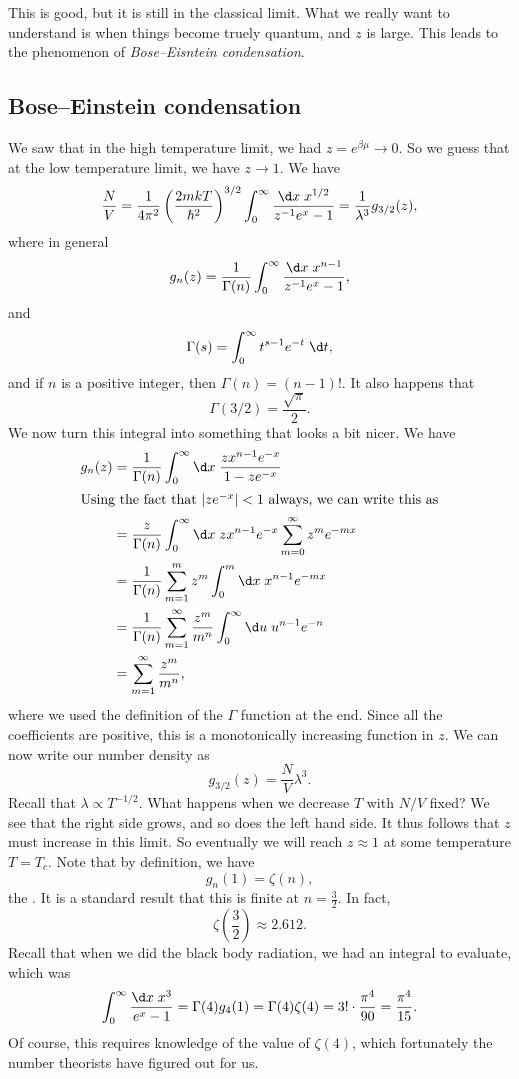 \documentclass[a4paper]{article}
\begin{document}
This is good, but it is still in the classical limit. What we really want to understand is when things become truely quantum, and $z$ is large. This leads to the phenomenon of \emph{Bose--Eisntein condensation}.

\subsection{Bose--Einstein condensation}
We saw that in the high temperature limit, we had $z = e^{\beta\mu} \to 0$. So we guess that at the low temperature limit, we have $z \to 1$. We have
\[
  \frac{N}{V} = \frac{1}{4 \pi^2} \left(\frac{2mkT}{\hbar^2}\right)^{3/2} \int_0^\infty \frac{\d x\; x^{1/2}}{ z^{-1} e^x - 1} = \frac{1}{\lambda^3} g_{3/2}(z),
\]
where in general
\[
  g_n(z) = \frac{1}{\Gamma(n)} \int_0^\infty \frac{\d x\; x^{n - 1}}{z^{-1} e^x - 1},
\]
and
\[
  \Gamma(s) = \int_0^\infty t^{s - 1} e^{-t} \;\d t,
\]
and if $n$ is a positive integer, then $\Gamma(n) = (n - 1)!$. It also happens that
\[
  \Gamma(3/2) = \frac{\sqrt{\pi}}{2}.
\]
We now turn this integral into something that looks a bit nicer. We have
\begin{align*}
  g_n(z) &= \frac{1}{\Gamma(n)} \int_0^\infty \d x\; \frac{z x^{n - 1} e^{-x}}{1 - z e^{-x}}\\
  \intertext{Using the fact that $|z e^{-x}| < 1$ always, we can write this as}
  &= \frac{z}{\Gamma(n)} \int_0^\infty \d x\; z x^{n - 1} e^{-x} \sum_{m = 0}^\infty z^m e^{-mx}\\
  &= \frac{1}{\Gamma(n)} \sum_{m = 1}^m z^m \int_0^m \d x\; x^{n - 1} e^{-mx}\\
  &= \frac{1}{\Gamma(n)} \sum_{m = 1}^\infty \frac{z^m}{m^n}\int_0^\infty \d u\; u^{n - 1} e^{-n}\\
  &= \sum_{m = 1}^\infty \frac{z^m}{m^n},
\end{align*}
where we used the definition of the $\Gamma$ function at the end. Since all the coefficients are positive, this is a monotonically increasing function in $z$. We can now write our number density as
\[
  g_{3/2}(z) = \frac{N}{V} \lambda^3.\tag{$\dagger$}
\]
Recall that $\lambda \propto T^{-1/2}$. What happens when we decrease $T$ with $N/V$ fixed? We see that the right side grows, and so does the left hand side. It thus follows that $z$ must increase in this limit. So eventually we will reach $z \approx 1$ at some temperature $T = T_c$. Note that by definition, we have
\[
  g_n(1) = \zeta(n),
\]
the . It is a standard result that this is finite at $n = \frac{3}{2}$. In fact,
\[
  \zeta\left(\frac{3}{2}\right) \approx 2.612.
\]
Recall that when we did the black body radiation, we had an integral to evaluate, which was
\[
  \int_0^\infty \frac{\d x\; x^3}{e^x - 1} = \Gamma(4) g_4(1) = \Gamma(4) \zeta(4) = 3! \cdot \frac{\pi^4}{90} = \frac{\pi^4}{15}.
\]
Of course, this requires knowledge of the value of $\zeta(4)$, which fortunately the number theorists have figured out for us. %
\end{document}
